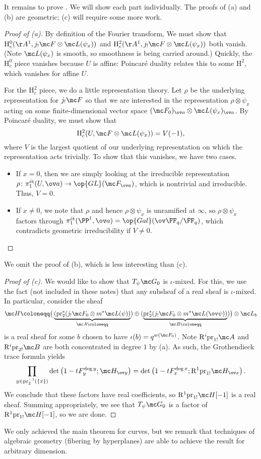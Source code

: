 \documentclass[../notes.tex]{subfiles}
\begin{document}
It remains to prove . We will show each part individually. The proofs of (a) and (b) are geometric; (c) will require some more work.
\begin{proof}[Proof of (a)]
	By definition of the Fourier transform, We must show that $\mathrm H^0_c(\AA^1,j_!\mc F\otimes\mc L(\psi_x))$ and $\mathrm H^2_c(\AA^1,j_!\mc F\otimes\mc L(\psi_x))$ both vanish. (Note $\mc L(\psi_x)$ is smooth, so smoothness is being carried around.) Quickly, the $\mathrm H^0_c$ piece vanishes because $U$ is affine: Poincar\'e duality relates this to some $\mathrm H^2$, which vanishes for affine $U$.

	For the $\mathrm H^2_c$ piece, we do a little representation theory. Let $\rho$ be the underlying representation for $j_!\mc F$ so that we are interested in the representation $\rho\otimes\psi_x$ acting on some finite-dimensional vector space $(\mc F_0)_{\ov a}\otimes\mc L(\psi_x)_{\ov a}$. By Poincar\'e duality, we must show that
	\[\mathrm H^2_c(U,\mc F\otimes\mc L(\psi_x))=V(-1),\]
	where $V$ is the largest quotient of our underlying representation on which the representation acts trivially. To show that this vanishes, we have two cases.
	\begin{itemize}
		\item If $x=0$, then we are simply looking at the irreducible representation $\rho\colon\pi_1^{\mathrm{\acute et}}(U,\ov a)\to\op{GL}(\mc F_{\ov a})$, which is nontrivial and irreducible. Thus, $V=0$.
		\item If $x\ne0$, we note that $\rho$ and hence $\rho\otimes\psi_x$ is unramified at $\infty$, so $\rho\otimes\psi_x$ factors through $\pi_1^{\mathrm{\acute et}}(\PP^1,\ov a)=\op{Gal}(\ov\FF_q/\FF_q)$, which contradicts geometric irreducibility if $V\ne0$.
		\qedhere
	\end{itemize}
\end{proof}
We omit the proof of (b), which is less interesting than (c).
\begin{proof}[Proof of (c)]
	We would like to show that $T_\psi\mc G_0$ is $\iota$-mixed. For this, we use the fact (not included in these notes) that any subsheaf of a real sheaf is $\iota$-mixed. In particular, consider the sheaf
	\[\mc H\coloneqq\big(\underbrace{(\mathrm{pr}_2^*(j_!\mc F_0\otimes m^*\mc L(\psi))}_{\mc A\coloneqq})\oplus(\underbrace{\mathrm{pr}_2^*(j_!\mc F_0\otimes m^*\mc L(\ov\psi))}_{\mc B\coloneqq})\big)\otimes\mc L_b\]
	is a real sheaf for some $b$ chosen to have $\iota(b)=q^{w(\mc F_0)}$. Note $\mathrm R^i\mathrm{pr}_{1!}\mc A$ and $\mathrm R^i\mathrm{pr}_{2!}\mc B$ are both concentrated in degree $1$ by (a). As such, the Grothendieck trace formula yields
	\[\prod_{y\in\mathrm{pr}_2^{-1}(\{x\})}\det\left(1-tF_y^{\deg y};\mc H_{\ov y}\right)=\det\left(1-tF_x^{\deg x};\mathrm R^1\mathrm{pr}_{1!}\mc H_{\ov x}\right).\]
	We conclude that these factors have real coefficients, so $\mathrm R^1\mathrm{pr}_{1!}\mc H[-1]$ is a real sheaf. Summing appropriately, we see that $T_\psi\mc G_0$ is a factor of $\mathrm R^1\mathrm{pr}_{1!}\mc H[-1]$, so we are done.
\end{proof}
\begin{remark}
	We only achieved the main theorem for curves, but we remark that techniques of algebraic geometry (fibering by hyperplanes) are able to achieve the result for arbitrary dimension.
\end{remark}
\end{document}
